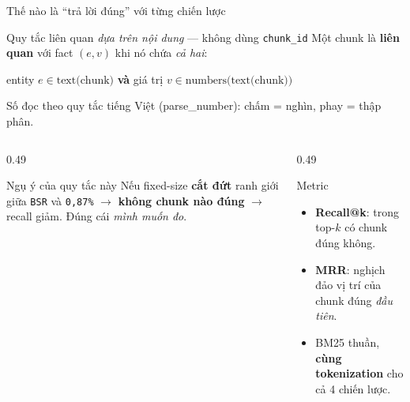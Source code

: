 \documentclass[aspectratio=169,11pt]{beamer}
\newcommand{\src}[1]{{\footnotesize\ttfamily #1}}
\begin{document}
\begin{frame}{Thế nào là ``trả lời đúng'' với từng chiến lược}
  \small
  \begin{block}{\small Quy tắc liên quan \emph{dựa trên nội dung} — không dùng \texttt{chunk\_id}}
    Một chunk là \textbf{liên quan} với fact $(e, v)$ khi nó chứa \emph{cả hai}:
    \begin{center}
      entity $e \in \text{text(chunk)}$ \quad\textbf{và}\quad
      giá trị $v \in \text{numbers}\bigl(\text{text(chunk)}\bigr)$
    \end{center}
    \footnotesize Số đọc theo quy tắc tiếng Việt (\src{parse\_number}): chấm = nghìn, phay = thập phân.
  \end{block}
  \begin{columns}[T]
    \begin{column}{0.49\textwidth}
      \begin{alertblock}{\small Ngụ ý của quy tắc này}
        Nếu fixed-size \textbf{cắt đứt} ranh giới giữa \texttt{BSR} và
        \texttt{0,87\%} $\rightarrow$ \textbf{không chunk nào đúng} $\rightarrow$
        recall giảm. Đúng cái \emph{mình muốn đo}.
      \end{alertblock}
    \end{column}
    \begin{column}{0.49\textwidth}
      \begin{block}{\small Metric}
        \begin{itemize}\small
          \item \textbf{Recall@k}: trong top-$k$ có chunk đúng không.
          \item \textbf{MRR}: nghịch đảo vị trí của chunk đúng \emph{đầu tiên}.
          \item BM25 thuần, \textbf{cùng tokenization} cho cả 4 chiến lược.
        \end{itemize}
      \end{block}
    \end{column}
  \end{columns}
\end{frame}
\end{document}
